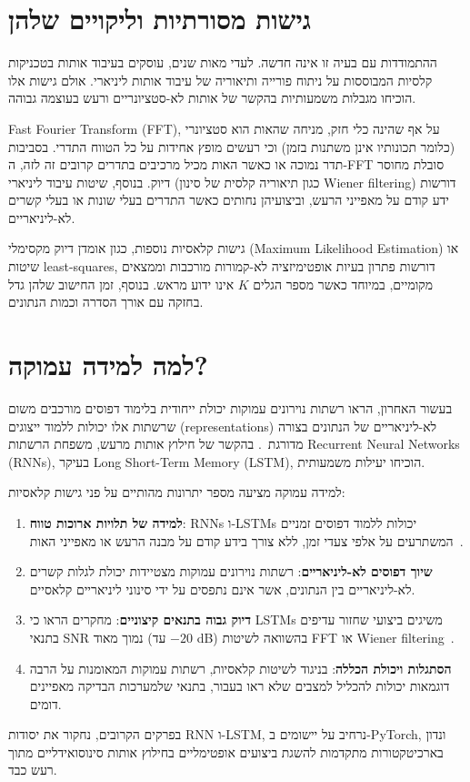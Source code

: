 \section{גישות מסורתיות וליקויים שלהן}

ההתמודדות עם בעיה זו אינה חדשה. לעדי מאות שנים, עוסקים בעיבוד אותות בטכניקות קלסיות המבוססות על ניתוח פורייה ותיאוריה של עיבוד אותות ליניארי. אולם גישות אלו הוכיחו מגבלות משמעותיות בהקשר של אותות לא-סטציונריים ורעש בעוצמה גבוהה.

\textenglish{Fast Fourier Transform} (FFT), על אף שהינה כלי חזק, מניחה שהאות הוא סטציונרי (כלומר תכונותיו אינן משתנות בזמן) וכי רעשים מופץ אחידות על כל הטווח התדרי. בסביבות תדר נמוכה או כאשר האות מכיל מרכיבים בתדרים קרובים זה לזה, ה-FFT סובלת מחוסר דיוק. בנוסף, שיטות עיבוד ליניארי (כגון תיאוריה קלסית של סינון \textenglish{Wiener filtering}) דורשות ידע קודם על מאפייני הרעש, וביצועיהן נחותים כאשר התדרים בעלי שונות או בעלי קשרים לא-ליניאריים.

גישות קלאסיות נוספות, כגון אומדן דיוק מקסימלי (\textenglish{Maximum Likelihood Estimation}) או שיטות \textenglish{least-squares}, דורשות פתרון בעיות אופטימיזציה לא-קמורות מורכבות וממצאים מקומיים, במיוחד כאשר מספר הגלים $K$ אינו ידוע מראש. בנוסף, זמן החישוב שלהן גדל בחזקה עם אורך הסדרה וכמות הנתונים.

\section{למה למידה עמוקה?}

בעשור האחרון, הראו רשתות נוירונים עמוקות יכולת ייחודית בלימוד דפוסים מורכבים משום שרשתות אלו יכולות ללמוד ייצוגים (representations) לא-ליניאריים של הנתונים בצורה מדורגת~\cite{xi2023rise}. בהקשר של חילוץ אותות מרעש, משפחת הרשתות \textenglish{Recurrent Neural Networks} (RNNs), בעיקר \textenglish{Long Short-Term Memory} (LSTM), הוכיחו יעילות משמעותית.

למידה עמוקה מציעה מספר יתרונות מהותיים על פני גישות קלאסיות:

\begin{enumerate}
\item \textbf{למידה של תלויות ארוכות טווח}: RNNs ו-LSTMs יכולות ללמוד דפוסים זמניים המשתרעים על אלפי צעדי זמן, ללא צורך בידע קודם על מבנה הרעש או מאפייני האות~\cite{xi2023rise}.

\item \textbf{שיוך דפוסים לא-ליניאריים}: רשתות נוירונים עמוקות מצטיידות יכולת לגלות קשרים לא-ליניאריים בין הנתונים, אשר אינם נתפסים על ידי סינוני ליניאריים קלאסיים.

\item \textbf{דיוק גבוה בתנאים קיצוניים}: מחקרים הראו כי LSTMs משיגים ביצועי שחזור עדיפים בתנאי SNR נמוך מאוד (עד $-20$ dB) בהשוואה לשיטות FFT או \textenglish{Wiener filtering}~\cite{wang2023survey_agents}.

\item \textbf{הסתגלות ויכולת הכללה}: בניגוד לשיטות קלאסיות, רשתות עמוקות המאומנות על הרבה דוגמאות יכולות להכליל למצבים שלא ראו בעבור, בתנאי שלמערכות הבדיקה מאפיינים דומים.
\end{enumerate}

בפרקים הקרובים, נחקור את יסודות RNN ו-LSTM, נרחיב על יישומים ב-\textenglish{PyTorch}, ונדון בארכיטקטורות מתקדמות להשגת ביצועים אופטימליים בחילוץ אותות סינוסואידליים מתוך רעש כבד.